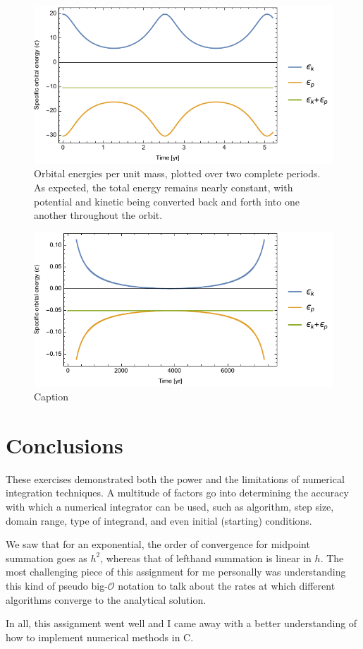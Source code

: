 \documentclass{article}
\begin{document}
\begin{figure}[h!]
    \centering
    \includegraphics[width=5in]{homework3/q3energy.pdf}
    \caption{Orbital energies per unit mass, plotted over two complete periods. As expected, the total energy remains nearly constant, with potential and kinetic being converted back and forth into one another throughout the orbit.}
    \label{fig:q3energy}
\end{figure}

\bigskip
{}
\medskip

\begin{figure}[h!]
    \centering
    \includegraphics[width=5in]{homework3/q4energy.pdf}
    \caption{Caption}
    \label{fig:q4energy}
\end{figure}

\section{Conclusions}

These exercises demonstrated both the power and the limitations of numerical integration techniques. A multitude of factors go into determining the accuracy with which a numerical integrator can be used, such as algorithm, step size, domain range, type of integrand, and even initial (starting) conditions.

We saw that for an exponential, the order of convergence for midpoint summation goes as $h^2$, whereas that of lefthand summation is linear in $h$. The most challenging piece of this assignment for me personally was understanding this kind of pseudo big-$\mathcal{O}$ notation to talk about the rates at which different algorithms converge to the analytical solution.

In all, this assignment went well and I came away with a better understanding of how to implement numerical methods in C.
\end{document}
